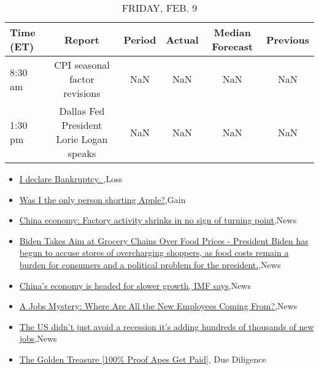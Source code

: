 \documentclass{article}%
\begin{document}
%


\begin{table}[htbp]%
\caption{FRIDAY, FEB. 9}%
\centering%
\begin{adjustbox}{width=1\textwidth}%
\begin{tabular}{lccccc}
\toprule
Time (ET) &                                  Report & Period & Actual & Median Forecast & Previous \\
\midrule
  8:30 am &           CPI seasonal factor revisions &    NaN &    NaN &             NaN &      NaN \\
  1:30 pm & Dallas Fed President Lorie Logan speaks &    NaN &    NaN &             NaN &      NaN \\
\bottomrule
\end{tabular}
%
\end{adjustbox}%
\end{table}

%
\begin{itemize}%
\item%
\href{https://reddit.com/r/wallstreetbets/comments/1ahseuj/i\_declare\_bankruptcy/}{I declare Bankruptcy. },Loss%
\item%
\href{https://reddit.com/r/wallstreetbets/comments/1ahqc27/was\_i\_the\_only\_person\_shorting\_apple/}{Was I the only person shorting Apple?},Gain%
\item%
\href{https://reddit.com/r/Economics/comments/1aho5pq/china\_economy\_factory\_activity\_shrinks\_in\_no\_sign/}{China economy: Factory activity shrinks in no sign of turning point},News%
\item%
\href{https://reddit.com/r/Economics/comments/1ahj0dg/biden\_takes\_aim\_at\_grocery\_chains\_over\_food/}{Biden Takes Aim at Grocery Chains Over Food Prices - President Biden has begun to accuse stores of overcharging shoppers, as food costs remain a burden for consumers and a political problem for the president.},News%
\item%
\href{https://reddit.com/r/Economics/comments/1ahi5f7/chinas\_economy\_is\_headed\_for\_slower\_growth\_imf/}{China's economy is headed for slower growth, IMF says},News%
\item%
\href{https://reddit.com/r/Economics/comments/1ahf5fh/a\_jobs\_mystery\_where\_are\_all\_the\_new\_employees/}{A Jobs Mystery: Where Are All the New Employees Coming From?},News%
\item%
\href{https://reddit.com/r/Economics/comments/1ah6nlp/the\_us\_didnt\_just\_avoid\_a\_recession\_its\_adding/}{The US didn't just avoid a recession  it's adding hundreds of thousands of new jobs},News%
\item%
\href{https://reddit.com/r/Superstonk/comments/1ahuip4/the\_golden\_treasure\_100\_proof\_apes\_get\_paid/}{The Golden Treasure [100\% Proof Apes Get Paid]}, Due Diligence%
\end{itemize}%
\end{document}

